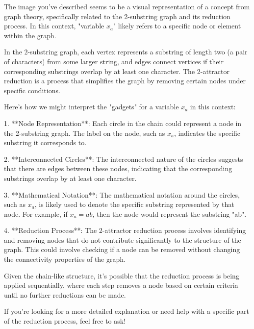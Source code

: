 The image you've described seems to be a visual representation of a concept from graph theory, specifically related to the 2-substring graph and its reduction process. In this context, "variable \(x_a\)" likely refers to a specific node or element within the graph.

In the 2-substring graph, each vertex represents a substring of length two (a pair of characters) from some larger string, and edges connect vertices if their corresponding substrings overlap by at least one character. The 2-attractor reduction is a process that simplifies the graph by removing certain nodes under specific conditions.

Here's how we might interpret the "gadgets" for a variable \(x_a\) in this context:

1. **Node Representation**: Each circle in the chain could represent a node in the 2-substring graph. The label on the node, such as \(x_a\), indicates the specific substring it corresponds to.

2. **Interconnected Circles**: The interconnected nature of the circles suggests that there are edges between these nodes, indicating that the corresponding substrings overlap by at least one character.

3. **Mathematical Notation**: The mathematical notation around the circles, such as \(x_a\), is likely used to denote the specific substring represented by that node. For example, if \(x_a = ab\), then the node would represent the substring "ab".

4. **Reduction Process**: The 2-attractor reduction process involves identifying and removing nodes that do not contribute significantly to the structure of the graph. This could involve checking if a node can be removed without changing the connectivity properties of the graph.

Given the chain-like structure, it's possible that the reduction process is being applied sequentially, where each step removes a node based on certain criteria until no further reductions can be made.

If you're looking for a more detailed explanation or need help with a specific part of the reduction process, feel free to ask!